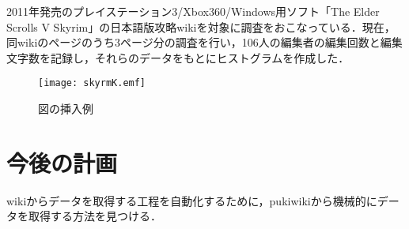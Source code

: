 \documentclass[uplatex,twocolumn,dvipdfmx]{jsarticle}
\begin{document}
2011年発売のプレイステーション3/Xbox360/Windows用ソフト「The Elder Scrolls V Skyrim」の日本語版攻略wiki\cite{wiki}を対象に調査をおこなっている．現在，同wikiのページのうち3ページ分の調査を行い，106人の編集者の編集回数と編集文字数を記録し，それらのデータをもとにヒストグラムを作成した．


\begin{figure}[h]
\centering
\texttt{[image: skyrmK.emf]}
\caption{図の挿入例}\label{サンプル図}
\end{figure}

\section{今後の計画}

wikiからデータを取得する工程を自動化するために，pukiwikiから機械的にデータを取得する方法を見つける．


\end{document}
